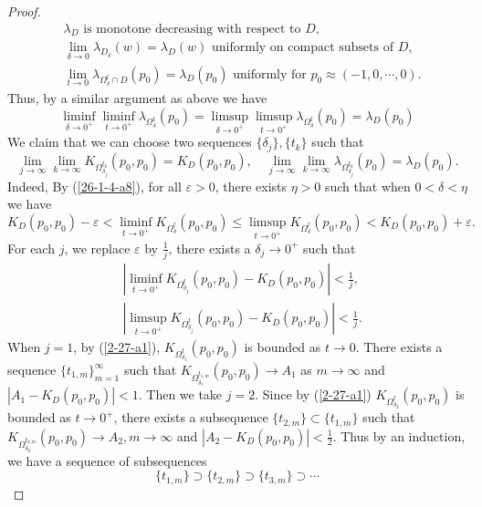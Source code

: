 \documentclass[a4paper,centertags,oneside,12pt]{amsart}
\numberwithin{equation}{section}
\begin{document}
\begin{proof}
\begin{equation}\label{prop:lambda}
\begin{aligned}
&\lambda_{D} \text{ is monotone decreasing with respect to } D, \\
&\lim_{\delta\rightarrow 0}\lambda_{D_{\delta}}(w)=\lambda_D(w) \text{ uniformly on compact subsets of } D, \\
&\lim_{t\rightarrow 0}\lambda_{\Omega^t_{\delta}\cap D}(p_0)=\lambda_D(p_0) \text{ uniformly for } p_0\approx(-1, 0, \cdots, 0).
\end{aligned}
\end{equation}
 Thus, by a similar argument as above we have
\begin{equation}\label{26-1-4-a9}
    \liminf_{\delta\rightarrow 0^+}\liminf_{t\rightarrow 0^+}\lambda_{\Omega^t_\delta}(p_0)=\limsup_{\delta\rightarrow 0^+}\limsup_{t\rightarrow 0^+}\lambda_{\Omega^t_\delta}(p_0)=\lambda_D(p_0)
\end{equation}
We claim that we can  choose two sequences $\{\delta_j\}, \{t_k\}$ such that
\begin{equation}\label{26-1-4-b6}
    \lim_{j\rightarrow\infty}\lim_{k\rightarrow\infty}K_{\Omega^{t_k}_{\delta_j}}(p_0,  p_0)=K_D(p_0,  p_0),\quad \lim_{j\rightarrow\infty}\lim_{k\rightarrow\infty}\lambda_{\Omega^{t_k}_{\delta_j}}(p_0)=\lambda_D(p_0).
\end{equation}
Indeed, By (\ref{26-1-4-a8}), for all $\varepsilon>0$, there exists $\eta>0$ such that when $0<\delta<\eta$ we have
\begin{equation*}
    K_D(p_0, p_0)-\varepsilon<\liminf_{t\rightarrow 0^{+}} K_{\Omega_\delta^t}(p_0, p_0)\leq \limsup_{t\rightarrow 0^{+}} K_{\Omega_\delta^t}(p_0, p_0)<K_D(p_0, p_0)+\varepsilon.
\end{equation*}
For each $j$,  we replace $\varepsilon$ by $\frac1j$, there exists a $\delta_j\rightarrow 0^{+}$ such that 
\begin{equation}\label{2-27-a1}
\begin{split}
    &\left|\liminf_{t\rightarrow 0^{+}}K_{\Omega_{\delta_j}^t}(p_0, p_0)-K_D(p_0, p_0)\right|<\frac 1j,\\
    &\left|\limsup_{t\rightarrow 0^{+}}K_{\Omega_{\delta_j}^t}(p_0, p_0)-K_D(p_0, p_0)\right|<\frac 1j.
    \end{split}
\end{equation}
When $j=1$, by (\ref{2-27-a1}), $K_{\Omega_{\delta_1}^t}(p_0, p_0)$ is bounded as $t\rightarrow 0$. There exists a sequence $\{t_{1, m}\}_{m=1}^\infty$ such that $K_{\Omega_{\delta_1}^{t_{1, m}}}(p_0, p_0) \rightarrow A_1$ as $m\rightarrow \infty$ and $|A_1- K_D(p_0, p_0)|<1$. Then we take $j=2$. Since by (\ref{2-27-a1}) $K_{\Omega_{\delta_2}^t}(p_0, p_0)$ is bounded as $t\rightarrow 0^{+}$, there exists a subsequence $\{t_{2, m}\}\subset\{t_{1, m}\}$ such that $K_{\Omega_{\delta_2}^{t_{2, m}}}(p_0, p_0)\rightarrow A_2, m\rightarrow\infty$ and $|A_2-K_D(p_0, p_0)|<\frac12$. Thus by an induction,  we have a sequence of subsequences $$\{t_{1, m}\}\supset\{t_{2, m}\}\supset\{t_{3, m}\}\supset\cdots$$

\end{proof}
\end{document}
